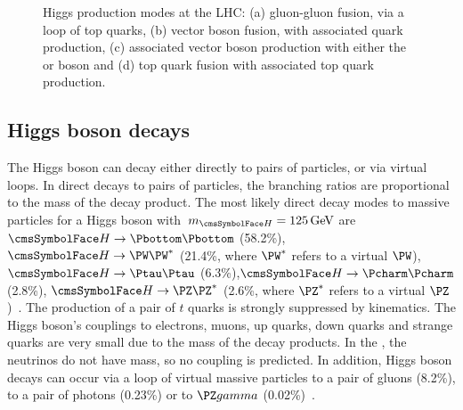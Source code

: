 \begin{figure}[h!]
{\begin{fmfgraph*}
  \end{fmfgraph*} 
  }
  \caption{Higgs production modes at the LHC: (a) gluon-gluon fusion, via a loop of top quarks, (b) vector boson fusion, with associated quark production, (c) associated vector boson production with either the \PZ or \PW boson and (d) top quark fusion with associated top quark production. }
  \label{fig:theory:higgsproduction}
  \end{figure}

\subsection{Higgs boson decays}
\label{th:sec:higgs_decays}

The \SM Higgs boson can decay either directly to pairs of particles, or via virtual loops.
In direct decays to pairs of particles, the  branching ratios are proportional to the mass of the decay product. The most likely direct decay modes to massive particles for a \SM Higgs boson with $\mH=125\GeV$ are $\PH \rightarrow \Pbottom \Pbottom$ (58.2\%), $\PH \rightarrow \PW \PW^{*}$ (21.4\%, where $\PW^{*}$ refers to a virtual $\PW$), $\PH \rightarrow \Ptau \Ptau$ (6.3\%),$\PH \rightarrow \Pcharm \Pcharm$ (2.8\%), $\PH \rightarrow \PZ \PZ^{*}$ (2.6\%, where $\PZ^{*}$ refers to a virtual $\PZ$)~\cite{LHCHXSWGYR4}. The production of a pair of $t$ quarks is strongly suppressed by kinematics. The Higgs boson's couplings to electrons, muons, up quarks, down quarks and strange quarks are very small due to the mass of the decay products. In the \SM, the neutrinos do not have mass, so no \SM coupling is predicted.
In addition, Higgs boson decays can occur via a loop of virtual massive particles to a pair of gluons (8.2\%), to a pair of photons (0.23\%) or to $\PZ\gamma$ (0.02\%)~\cite{LHCHXSWGRY4}. 

